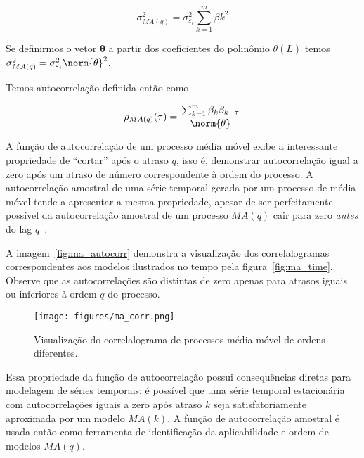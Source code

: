 $$\sigma^{2}_{MA(q)} = \sigma_{\varepsilon_t}^2 \sum^{m}_{k=1} \beta{k}^2 $$

Se definirmos o vetor $\mathbf{\theta}$ a partir dos coeficientes do polinômio
$\theta(L)$ temos $\sigma^{2}_{MA(q)} = \sigma_{\varepsilon_t}^2\norm{\mathbf{\theta}}^2$.

Temos autocorrelação definida então como

$$\rho_{MA(q)}(\tau) = \frac{\sum^{m}_{k=1} \beta_k\beta_{k-\tau}}{\norm{\mathbf{\theta}}}$$


A função de autocorrelação de um processo média móvel exibe a interessante
propriedade de ``cortar'' após o atraso $q$, isso é, demonstrar autocorrelação
igual a zero após um atraso de número correspondente à ordem do processo. A
autocorrelação amostral de uma série temporal gerada por um processo de média
móvel tende a apresentar a mesma propriedade, apesar de ser perfeitamente
possível da autocorrelação amostral de um processo $MA(q)$ cair para zero
\emph{antes} do lag $q$~\cite{chatfield}.

A imagem~\ref{fig:ma_autocorr} demonstra a visualização dos correlalogramas
correspondentes aos modelos ilustrados no tempo pela figura~\ref{fig:ma_time}.
Observe que as autocorrelações são distintas de zero apenas para atrasos
iguais ou inferiores à ordem $q$ do processo.

\begin{figure}[H]
    \centering
    \texttt{[image: figures/ma\_corr.png]}
    \caption{Visualização do correlalograma de processos média móvel de ordens
    diferentes.}
    \label{fig:ma_corr}
\end{figure}

Essa propriedade da função de autocorrelação possui consequências diretas para
modelagem de séries temporais: é possível que uma série temporal estacionária
com autocorrelações iguais a zero após atraso $k$ seja satisfatoriamente
aproximada por um modelo $MA(k)$. A função de autocorrelação amostral é usada
então como ferramenta de identificação da aplicabilidade e ordem de modelos
$MA(q)$.



